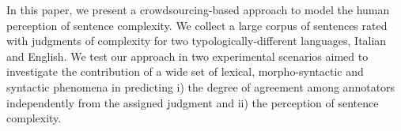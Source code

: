 In this paper, we present a crowdsourcing-based approach to model the human perception of sentence complexity. We collect a large corpus of sentences rated with judgments of complexity for two typologically-different languages, Italian and English. We test our approach in two experimental scenarios aimed to investigate the contribution of a wide set of lexical, morpho-syntactic and syntactic phenomena in predicting i) the degree of agreement among annotators independently from the assigned judgment and ii) the perception of sentence complexity.
